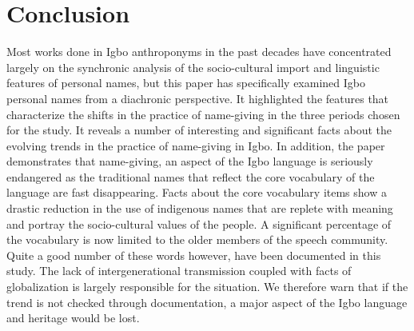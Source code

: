 \documentclass[output=paper]{langscibook}
\begin{document}
\section{Conclusion}
Most works done in Igbo anthroponyms in the past decades have concentrated largely on the synchronic analysis of the socio-cultural import and linguistic features of personal names, but this paper has specifically examined Igbo personal names from a diachronic perspective. It highlighted the features that characterize the shifts in the practice of name-giving in the three periods chosen for the study. It reveals a number of interesting and significant facts about the evolving trends in the practice of name-giving in Igbo. In addition, the paper demonstrates that name-giving, an aspect of the Igbo language is seriously endangered as the traditional names that reflect the core vocabulary of the language are fast disappearing. Facts about the core vocabulary items show a drastic reduction in the use of indigenous names that are replete with meaning and portray the socio-cultural values of the people. A significant percentage of the vocabulary is now limited to the older members of the speech community. Quite a good number of these words however, have been documented in this study. The lack of intergenerational transmission coupled with facts of globalization is largely responsible for the situation.  We therefore warn that if the trend is not checked through documentation, a major aspect of the Igbo language and heritage would be lost.

{\sloppy\printbibliography[heading=subbibliography,notkeyword=this]}
\end{document}
